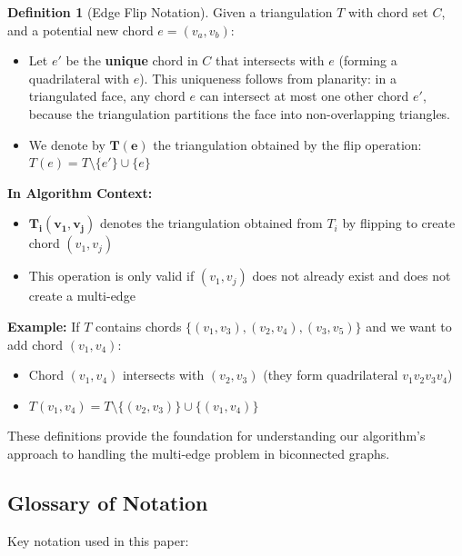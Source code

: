 \documentclass[12pt,a4paper]{article}
\theoremstyle{definition}
\newtheorem{definition}{Definition}
\theoremstyle{remark}
\begin{document}
\begin{definition}[Edge Flip Notation]
\label{def:edgeflip}
Given a triangulation $T$ with chord set $C$, and a potential new chord $e = (v_a, v_b)$:
\begin{itemize}
    \item Let $e'$ be the \textbf{unique} chord in $C$ that intersects with $e$ (forming a quadrilateral with $e$). This uniqueness follows from planarity: in a triangulated face, any chord $e$ can intersect at most one other chord $e'$, because the triangulation partitions the face into non-overlapping triangles.
    \item We denote by $\mathbf{T(e)}$ the triangulation obtained by the flip operation: $T(e) = T \setminus \{e'\} \cup \{e\}$
\end{itemize}

\textbf{In Algorithm Context:}
\begin{itemize}
    \item $\mathbf{T_i(v_1, v_j)}$ denotes the triangulation obtained from $T_i$ by flipping to create chord $(v_1, v_j)$
    \item This operation is only valid if $(v_1, v_j)$ does not already exist and does not create a multi-edge
\end{itemize}

\textbf{Example:} If $T$ contains chords $\{(v_1,v_3), (v_2,v_4), (v_3,v_5)\}$ and we want to add chord $(v_1,v_4)$:
\begin{itemize}
    \item Chord $(v_1,v_4)$ intersects with $(v_2,v_3)$ (they form quadrilateral $v_1v_2v_3v_4$)
    \item $T(v_1,v_4) = T \setminus \{(v_2,v_3)\} \cup \{(v_1,v_4)\}$
\end{itemize}
\end{definition}

These definitions provide the foundation for understanding our algorithm's approach to handling the multi-edge problem in biconnected graphs.

\subsection{Glossary of Notation}

Key notation used in this paper:
\end{document}
